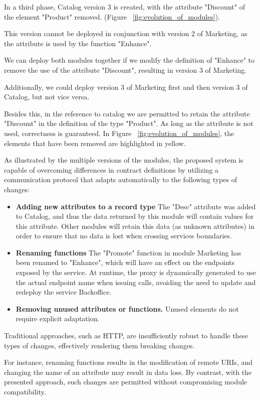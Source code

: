 In a third phase, Catalog version 3 is created, with the attribute "Discount" of the element "Product" removed.  (Figure ~\ref{fig:evolution_of_modules}).

This version cannot be deployed in conjunction with version 2 of Marketing, as the attribute is used by the function "Enhance".

We can deploy both modules together if we modify the definition of "Enhance" to remove the use of the attribute "Discount", resulting in version 3 of Marketing.

Additionally, we could deploy version 3 of Marketing first and then version 3 of Catalog, but not vice versa.

Besides this, in the reference to catalog we are permitted to retain the attribute "Discount" in the definition of the type "Product".
As long as the attribute is not used, correctness is guaranteed.
In Figure ~\ref{fig:evolution_of_modules}, the elements that have been removed are highlighted in yellow.

As illustrated by the multiple versions of the modules,
the proposed system is capable of overcoming differences in contract definitions by utilizing a communication protocol
that adapts automatically to the following types of changes:

\begin{itemize}
    \item \textbf{Adding new attributes to a record type} The "Desc" attribute was added to Catalog, and thus the data returned by this module will contain values for this attribute.
    Other modules will retain this data (as unknown attributes) in order to ensure that no data is lost when crossing services boundaries.
    \item \textbf{Renaming functions} The "Promote" function in module Marketing has been renamed to "Enhance", which will have an effect on the endpoints exposed by the service.
    At runtime, the proxy is dynamically generated to use the actual endpoint name when issuing calls, avoiding the need to update and redeploy the service Backoffice.
    \item \textbf{Removing unused attributes or functions.} Unused elements do not require explicit adaptation.
\end{itemize}

Traditional approaches, such as HTTP, are insufficiently robust to handle these types of changes, effectively rendering them breaking changes.

For instance, renaming functions results in the modification of remote URIs, and changing the name of an attribute may result in data loss.
By contrast, with the presented approach, such changes are permitted without compromising module compatibility.

